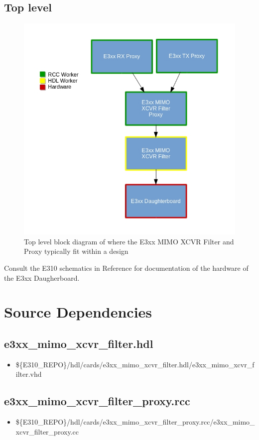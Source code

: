 \documentclass{article}
\def\comp{e3xx\_mimo\_xcvr\_filter}
\def\proxy{e3xx\_mimo\_xcvr\_filter\_proxy}
\def\Comp{E3xx MIMO XCVR Filter and Proxy }
\begin{document}
\subsection*{Top level}
\begin{figure}[ht]
	\centerline{\includegraphics[scale=0.75]{e3xx_mimo_filter_top_level_diagram}}
	\caption{Top level block diagram of where the \Comp typically fit within a design}
	\label{fig:tb}
\end{figure}
\flushleft
Consult the E310 schematics in Reference \cite{schematics} for documentation of the hardware of the E3xx Daugherboard.
\section*{Source Dependencies}
\subsection*{\comp.hdl}
\begin{itemize}
	\item \$\{E310\_REPO\}/hdl/cards/\comp.hdl/\comp.vhd
\end{itemize}
\subsection*{\proxy.rcc}
\begin{itemize}
	\item \$\{E310\_REPO\}/hdl/cards/\proxy.rcc/\proxy.cc
\end{itemize}
\end{document}
